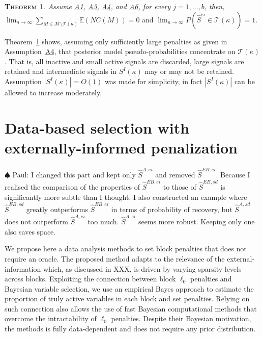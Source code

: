 \documentclass[
  12pt]{article}
\newcommand{\paul}[1]{{\small{\color{green} \sf $\spadesuit$ Paul: #1}}}
\newcommand{\E}{\mathbb{E}}
\newcommand{\M}{\mathcal{M}}
\newcommand{\T}{\mathcal{T}}
\newtheorem{thm}{\textsc{Theorem}}[section]
\begin{document}
\begin{thm}\label{thm:convtoT}
    Assume \hyperlink{lab:A1}{A1}, \hyperlink{lab:A3}{A3}, \hyperlink{lab:A4}{A4}, and \hyperlink{lab:A6}{A6}, for every $j=1,\ldots,b$,  then, \\$\lim_{n \to \infty} \sum_{M \in \M\setminus \T(\kappa)} \E\left(NC(M)\right)= 0 \mbox{  and  } 
    \lim_{n \to \infty} P(\hat{S}^{ei} \in \T(\kappa))= 1.$
\end{thm}
Theorem~\ref{thm:convtoT} shows, assuming only sufficiently large penalties as given in Assumption~\hyperlink{lab:A4}{A4}, that posterior model pseudo-probabilities concentrate on $\T(\kappa)$. That is, all inactive and small active signals are discarded, large signals are retained and intermediate signals in $S^{I}(\kappa)$ may or may not be retained. Assumption $|S^{I}(\kappa)|=O(1)$ was made for simplicity, in fact $|S^{I}(\kappa)|$ can be allowed to increase moderately. 


\section{Data-based selection with externally-informed penalization}\label{sec:informed_l0}

\paul{I changed this part and kept only $\hat S^{A,ei}$ and removed $\hat S^{EB,ei}$. Because I realised the comparison of the properties of $\hat S^{EB,ei}$ to those of $\hat S^{EB,sd}$ is significantly more subtle than I thought. I also constructed an example where $\hat S^{EB,sd}$ greatly outperforms $\hat S^{EB,ei}$ in terms of probability of recovery, but $\hat S^{A,sd}$ does not outperform $\hat S^{A,ei}$ too much. $\hat S^{A,ei}$ seems more robust. Keeping only one also saves space.}  

We propose here a data analysis methods to set block penalties that does not require an oracle. The proposed method adapts to the relevance of the external-information which, as discussed in XXX, is driven by varying sparsity levels across blocks. Exploiting the connection between block $\ell_0$ penalties and Bayesian variable selection, we use an empirical Bayes approach to estimate the proportion of truly active variables in each block and set penalties. Relying on such connection also allows the use of fast Bayesian computational methods that overcome the intractability of $\ell_0$ penalties. Despite their Bayesian motivation, the methods is fully data-dependent and does not require any prior distribution.
\end{document}
